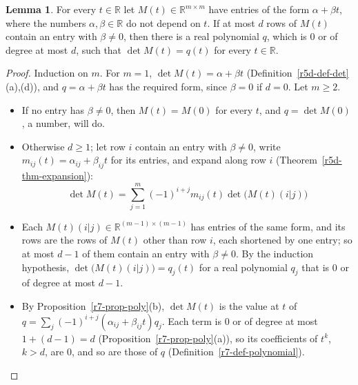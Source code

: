 \documentclass[12pt]{article}
\newcommand{\R}{\mathbb R}
\theoremstyle{definition}
\newtheorem{lemma}[theorem]{Lemma}
\begin{document}
\begin{lemma}\label{r7-lem-degree}
For every \(t\in\R\) let \(M(t)\in\R^{m\times m}\) have entries of the form \(\alpha+\beta t\), where the numbers
\(\alpha,\beta\in\R\) do not depend on \(t\). If at most \(d\) rows of \(M(t)\) contain an entry with \(\beta\ne0\), then
there is a real polynomial \(q\), which is \(0\) or of degree at most \(d\), such that \(\det M(t)=q(t)\) for every
\(t\in\R\).
\end{lemma}
\begin{proof}
Induction on \(m\). For \(m=1\), \(\det M(t)=\alpha+\beta t\) (Definition~\ref{r5d-def-det}(a),(d)), and \(q=\alpha+\beta t\)
has the required form, since \(\beta=0\) if \(d=0\). Let \(m\geqslant2\).
\begin{itemize}
\item If no entry has \(\beta\ne0\), then \(M(t)=M(0)\) for every \(t\), and \(q=\det M(0)\), a number, will do.
\item Otherwise \(d\geqslant1\); let row \(i\) contain an entry with \(\beta\ne0\), write
\(m_{ij}(t)=\alpha_{ij}+\beta_{ij}t\) for its entries, and expand along row \(i\) (Theorem~\ref{r5d-thm-expansion}):
\[
\det M(t)=\sum_{j=1}^m(-1)^{i+j}m_{ij}(t)\det\bigl(M(t)(i|j)\bigr)
\]
\item Each \(M(t)(i|j)\in\R^{(m-1)\times(m-1)}\) has entries of the same form, and its rows are the rows of \(M(t)\)
other than row \(i\), each shortened by one entry; so at most \(d-1\) of them contain an entry with \(\beta\ne0\). By the
induction hypothesis, \(\det\bigl(M(t)(i|j)\bigr)=q_j(t)\) for a real polynomial \(q_j\) that is \(0\) or of degree at
most \(d-1\).
\item By Proposition~\ref{r7-prop-poly}(b), \(\det M(t)\) is the value at \(t\) of
\(q=\sum_j(-1)^{i+j}(\alpha_{ij}+\beta_{ij}t)q_j\). Each term is \(0\) or of degree at most \(1+(d-1)=d\)
(Proposition~\ref{r7-prop-poly}(a)), so its coefficients of \(t^k\), \(k>d\), are \(0\), and so are those of \(q\)
(Definition~\ref{r7-def-polynomial}).\qedhere
\end{itemize}
\end{proof}
\end{document}
